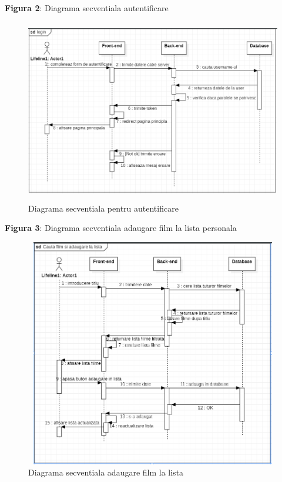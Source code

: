 \par \textbf{Figura 2}: Diagrama secventiala autentificare
		\begin{figure}[htbp]
			\centerline{\includegraphics[width=13cm, height=8cm]{figures/login diagrma secventiala.png}}
			\caption{Diagrama secventiala pentru autentificare}
			\label{fig}
		\end{figure}
\newline
\newline
\newline
\newline
\newline
\par \textbf{Figura 3}: Diagrama secventiala adaugare film la lista personala
		\begin{figure}[!h]
			\centerline{\includegraphics[width=14cm, height=10cm]{figures/cauta si adauga.png}}
			\caption{Diagrama secventiala adaugare film la lista}
			\label{fig}
		\end{figure}

